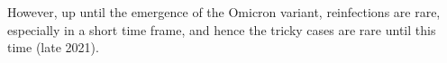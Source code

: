 \documentclass[thesis.tex]{subfiles}
\begin{document}
However, up until the emergence of the Omicron variant, reinfections are rare, especially in a short time frame, and hence the tricky cases are rare until this time (late 2021).


\ifSubfilesClassLoaded{
  \listoftodos
}{}
\end{document}
